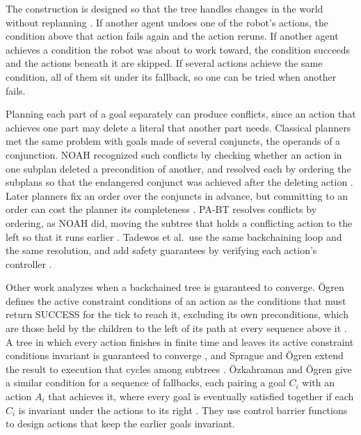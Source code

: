     The construction is designed so that the tree handles changes in the world without replanning \cite{colledanchise2019pabt}.
    If another agent undoes one of the robot's actions, the condition above that action fails again and the action reruns.
    If another agent achieves a condition the robot was about to work toward, the condition succeeds and the actions beneath it are skipped.
    If several actions achieve the same condition, all of them sit under its fallback, so one can be tried when another fails.
    
    Planning each part of a goal separately can produce conflicts, since an action that achieves one part may delete a literal that another part needs.
    Classical planners met the same problem with goals made of several conjuncts, the operands of a conjunction.
    NOAH recognized such conflicts by checking whether an action in one subplan deleted a precondition of another, and resolved each by ordering the subplans so that the endangered conjunct was achieved after the deleting action \cite{sacerdoti1975}.
    Later planners fix an order over the conjuncts in advance, but committing to an order can cost the planner its completeness \cite{koehler2000}.
    PA-BT resolves conflicts by ordering, as NOAH did, moving the subtree that holds a conflicting action to the left so that it runs earlier \cite{colledanchise2019pabt}.
    Tadewos et al.\ use the same backchaining loop and the same resolution, and add safety guarantees by verifying each action's controller \cite{tadewos2019}.

    Other work analyzes when a backchained tree is guaranteed to converge.
    Ögren defines the active constraint conditions of an action as the conditions that must return SUCCESS for the tick to reach it, excluding its own preconditions, which are those held by the children to the left of its path at every sequence above it \cite{ogren2020}.
    A tree in which every action finishes in finite time and leaves its active constraint conditions invariant is guaranteed to converge \cite{ogren2020}, and Sprague and Ögren extend the result to execution that cycles among subtrees \cite{sprague2023}.
    Özkahraman and Ögren give a similar condition for a sequence of fallbacks, each pairing a goal $C_i$ with an action $A_i$ that achieves it, where every goal is eventually satisfied together if each $C_i$ is invariant under the actions to its right \cite{ozkahraman2020}.
    They use control barrier functions to design actions that keep the earlier goals invariant.

